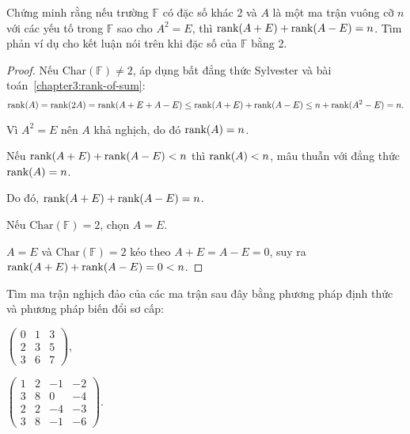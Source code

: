 \documentclass[class=linear-algebra,crop=false]{standalone}
\begin{document}
\begin{exercise}
	\par Chứng minh rằng nếu trường $\mathbb{F}$ có đặc số khác 2 và $A$ là một ma trận vuông cỡ $n$ với các yếu tố trong $\mathbb{F}$ sao cho $A^{2} = E$, thì $\text{rank}(A + E) + \text{rank}(A - E) = n$. Tìm phản ví dụ cho kết luận nói trên khi đặc số của $\mathbb{F}$ bằng 2.
\end{exercise}

\begin{proof}
	\par Nếu $\text{Char}(\mathbb{F})\ne 2$, áp dụng bất đẳng thức Sylvester và bài toán~\ref{chapter3:rank-of-sum}:
	\[
		\text{rank}(A) = \text{rank}(2A) = \text{rank}(A+E + A-E) \le \text{rank}(A+E) + \text{rank}(A-E) \le n + \text{rank}(A^{2} - E) = n.
	\]
	\par Vì $A^{2} = E$ nên $A$ khả nghịch, do đó $\text{rank}(A) = n$.
	\par Nếu $\text{rank}(A + E) + \text{rank}(A - E) < n$ thì $\text{rank}(A) < n$, mâu thuẫn với đẳng thức $\text{rank}(A) = n$.
	\par Do đó, $\text{rank}(A + E) + \text{rank}(A - E) = n$.
	\bigskip
	\par Nếu $\text{Char}(\mathbb{F}) = 2$, chọn $A = E$.
	\par $A = E$ và $\text{Char}(\mathbb{F}) = 2$ kéo theo $A + E = A - E = 0$, suy ra $\text{rank}(A + E) + \text{rank}(A - E) = 0 < n$.
\end{proof}

\begin{exercise}
	\par Tìm ma trận nghịch đảo của các ma trận sau đây bằng phương pháp định thức và phương pháp biến đổi sơ cấp:
	\begin{center}
		\begin{enumerate*}[label = (\alph*)]
			\item $\begin{pmatrix}
					      0 & 1 & 3 \\
					      2 & 3 & 5 \\
					      3 & 6 & 7
				      \end{pmatrix}$,
			\item $\begin{pmatrix}
					      1 & 2 & -1 & -2 \\
					      3 & 8 & 0  & -4 \\
					      2 & 2 & -4 & -3 \\
					      3 & 8 & -1 & -6
				      \end{pmatrix}$.
		\end{enumerate*}
	\end{center}
\end{exercise}
\end{document}
